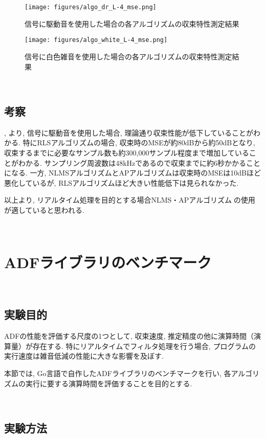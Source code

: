 \begin{figure}[H]
\centering
\texttt{[image: figures/algo\_dr\_L-4\_mse.png]}
\caption{信号に駆動音を使用した場合の各アルゴリズムの収束特性測定結果}
\label{fig:drone_algo_convergence}
\end{figure}

\begin{figure}[H]
\centering
\texttt{[image: figures/algo\_white\_L-4\_mse.png]}
\caption{信号に白色雑音を使用した場合の各アルゴリズムの収束特性測定結果}
\label{fig:white_algo_convergence}
\end{figure}

\
\subsection{考察}\label{consideration-color}

, より, 信号に駆動音を使用した場合, 理論通り収束性能が低下していることがわかる. 特にRLSアルゴリズムの場合, 収束時のMSEが約80dBから約50dBとなり, 収束するまでに必要なサンプル数も約300,000サンプル程度まで増加していることがわかる. サンプリング周波数は48kHzであるので収束までに約6秒かかることになる. 一方, NLMSアルゴリズムとAPアルゴリズムは収束時のMSEは10dBほど悪化しているが, RLSアルゴリズムほど大きい性能低下は見られなかった. 

以上より, リアルタイム処理を目的とする場合NLMS・APアルゴリズムの使用が適していると思われる. 

\
\section{ADFライブラリのベンチマーク}\label{benchmark}

\
\subsection{実験目的}\label{purpose-benchmark}

ADFの性能を評価する尺度の1つとして, 収束速度, 推定精度の他に演算時間（演算量）が存在する. 
特にリアルタイムでフィルタ処理を行う場合, プログラムの実行速度は雑音低減の性能に大きな影響を及ぼす. 

本節では, Go言語で自作したADFライブラリのベンチマークを行い, 各アルゴリズムの実行に要する演算時間を評価することを目的とする. 

\
\subsection{実験方法}\label{instruction-benchmark}

